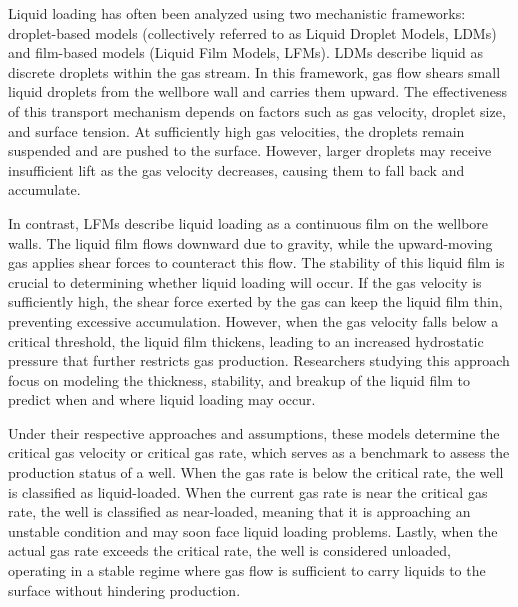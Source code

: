\documentclass[journal=jacsat,manuscript=article]{achemso}
\theoremstyle{thmstyleone}%
\theoremstyle{thmstyletwo}%
\theoremstyle{thmstylethree}%
\begin{document}
Liquid loading has often been analyzed using two mechanistic frameworks: droplet-based models (collectively referred to as Liquid Droplet Models, LDMs) and film-based models (Liquid Film Models, LFMs).\cite{Dukler1960} LDMs describe liquid as discrete droplets within the gas stream\cite{CHEN2016178, Chen2016}. In this framework, gas flow shears small liquid droplets from the wellbore wall and carries them upward. The effectiveness of this transport mechanism depends on factors such as gas velocity, droplet size, and surface tension. At sufficiently high gas velocities, the droplets remain suspended and are pushed to the surface. However, larger droplets may receive insufficient lift as the gas velocity decreases, causing them to fall back and accumulate\cite{Turner1969, Coleman1991a, Li2001}.

In contrast, LFMs describe liquid loading as a continuous film on the wellbore walls. The liquid film flows downward due to gravity, while the upward-moving gas applies shear forces to counteract this flow. The stability of this liquid film is crucial to determining whether liquid loading will occur. If the gas velocity is sufficiently high, the shear force exerted by the gas can keep the liquid film thin, preventing excessive accumulation. However, when the gas velocity falls below a critical threshold, the liquid film thickens, leading to an increased hydrostatic pressure that further restricts gas production. Researchers studying this approach focus on modeling the thickness, stability, and breakup of the liquid film to predict when and where liquid loading may occur\cite{Turner1969, Faidairo2014, LANDJOBOPAGOU2020103641}.  

Under their respective approaches and assumptions, these models determine the critical gas velocity or critical gas rate, which serves as a benchmark to assess the production status of a well. When the gas rate is below the critical rate, the well is classified as liquid-loaded. When the current gas rate is near the critical gas rate, the well is classified as near-loaded, meaning that it is approaching an unstable condition and may soon face liquid loading problems. Lastly, when the actual gas rate exceeds the critical rate, the well is considered unloaded, operating in a stable regime where gas flow is sufficient to carry liquids to the surface without hindering production.
\end{document}
